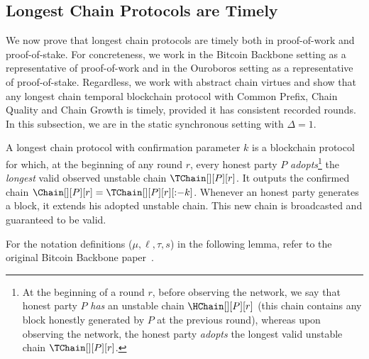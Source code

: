 \subsection{Longest Chain Protocols are Timely}

We now prove that longest chain protocols are timely both in proof-of-work and proof-of-stake.
For concreteness, we work in the Bitcoin Backbone setting
as a representative of proof-of-work and in the Ouroboros setting
as a representative of proof-of-stake.
Regardless, we work with abstract chain virtues
and show that any longest chain
temporal blockchain protocol with Common Prefix,
Chain Quality and Chain Growth is timely,
provided it has consistent recorded rounds.
In this subsection, we are in the
static synchronous setting with $\Delta = 1$.

\begin{definition}
  A longest chain protocol with confirmation parameter $k$
  is a blockchain protocol for which,
  at the beginning of any round $r$, every honest party $P$ \emph{adopts}\footnote{
    At the beginning of a round $r$, before observing the network, we say that
    honest party $P$ \emph{has} an unstable chain $\HChain[][P][r]$ (this chain
    contains any block honestly generated by $P$ at the previous round), whereas
    upon observing the network, the honest party \emph{adopts} the longest
    valid unstable chain $\TChain[][P][r]$.
  }
  the \emph{longest} valid observed unstable chain $\TChain[][P][r]$. It outputs the
  confirmed chain $\Chain[][P][r] = \TChain[][P][r][{:}{-k}]$.
  Whenever an honest party generates a block, it extends
  his adopted unstable chain. This new chain is broadcasted and
  guaranteed to be valid.
\end{definition}

For the notation definitions ($\mu, \ell, \tau, s$)
in the following lemma, refer to the original Bitcoin
Backbone paper~\cite{backbone-new}.

